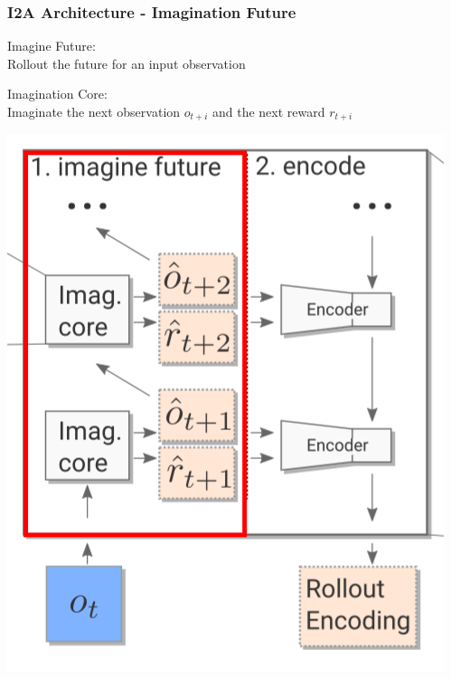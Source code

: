 \begin{frame}
    \frametitle{I2A Architecture - Imagination Future}

\begin{multicols}{2}
	\begin{PraesentationAufzaehlung}
		\item Imagine Future:\\
		Rollout the future for an input observation
	    \item Imagination Core:\\
		Imaginate the next observation $o_{t+i}$ and the next reward $r_{t+i}$
	\end{PraesentationAufzaehlung}
    \vfill\columnbreak
	\begin{center}
    \includegraphics[height=.5\textheight]{./Images/imagine_future.png}%
	\end{center}
\end{multicols}
    
\end{frame}
\clearpage

